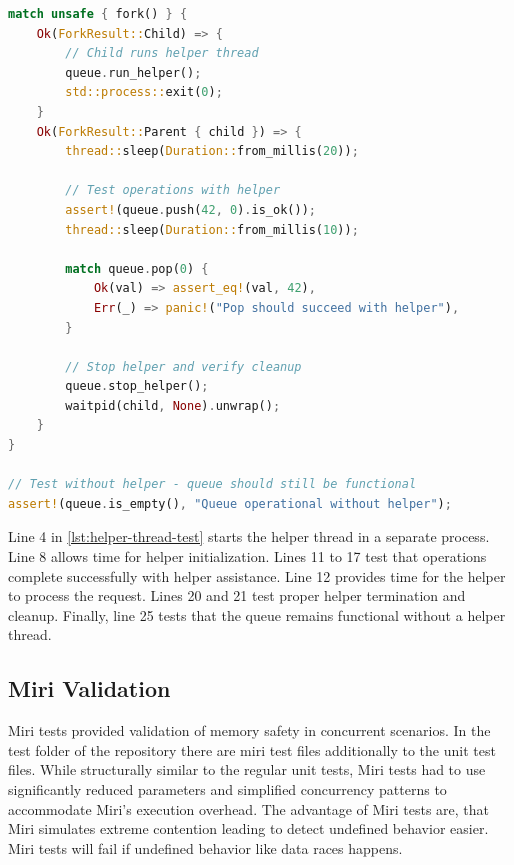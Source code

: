 \begin{lstlisting}[language=Rust, style=boxed, caption={Helper thread coordination test}, label={lst:helper-thread-test}]
match unsafe { fork() } {
    Ok(ForkResult::Child) => {
        // Child runs helper thread
        queue.run_helper();
        std::process::exit(0);
    }
    Ok(ForkResult::Parent { child }) => {
        thread::sleep(Duration::from_millis(20));
        
        // Test operations with helper
        assert!(queue.push(42, 0).is_ok());
        thread::sleep(Duration::from_millis(10));
        
        match queue.pop(0) {
            Ok(val) => assert_eq!(val, 42),
            Err(_) => panic!("Pop should succeed with helper"),
        }
        
        // Stop helper and verify cleanup
        queue.stop_helper();
        waitpid(child, None).unwrap();
    }
}

// Test without helper - queue should still be functional
assert!(queue.is_empty(), "Queue operational without helper");
\end{lstlisting}

Line 4 in \cref{lst:helper-thread-test} starts the helper thread in a separate process. Line 8 allows time for helper initialization. Lines 11 to 17 test that operations complete successfully with helper assistance. Line 12 provides time for the helper to process the request. Lines 20 and 21 test proper helper termination and cleanup. Finally, line 25 tests that the queue remains functional without a helper thread.

\subsection{Miri Validation}
Miri tests provided validation of memory safety in concurrent scenarios. In the test folder of the repository there are miri test files additionally to the unit test files. While structurally similar to the regular unit tests, Miri tests had to use significantly reduced parameters and simplified concurrency patterns to accommodate Miri's execution overhead. The advantage of Miri tests are, that Miri simulates extreme contention leading to detect undefined behavior easier. Miri tests will fail if undefined behavior like data races happens.


